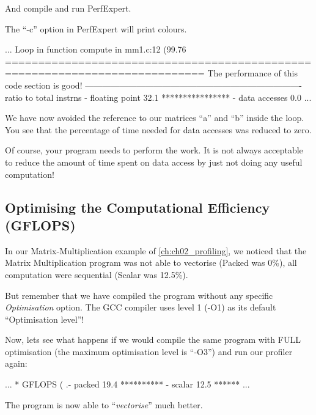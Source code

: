 And compile and run PerfExpert.

The ``-c'' option in PerfExpert will print colours.

\begin{prompt}
...
Loop in function compute in mm1.c:12 (99.76%
============================================================================
The performance of this code section is good!
----------------------------------------------------------------------------
ratio to total instrns    %
 - floating point       32.1 ****************
 - data accesses         0.0
...
\end{prompt}

We have now avoided the reference to our matrices ``a'' and ``b'' inside the loop. You see that the percentage of time needed for data accesses was reduced to zero.

 Of course, your program needs to perform the work. It is not always acceptable to reduce the amount of time spent on data access by just not doing any useful computation!

\subsection{Optimising the Computational Efficiency (GFLOPS)}
\label{subsec:Optimizing_Computational_Efficiancy}

In our Matrix-Multiplication example of \autoref{ch:ch02_profiling}, we noticed that the Matrix Multiplication program was not able to vectorise (Packed was 0\%), all computation were sequential (Scalar was 12.5\%).

But remember that we have compiled the program without any specific \textit{Optimisation} option. The GCC compiler uses level 1 (-O1) as its default ``Optimisation level''!

Now, lets see what happens if we would compile the same program with FULL optimisation (the maximum optimisation level is ``-O3'') and run our profiler again:

\begin{prompt}
...
* GFLOPS (%
.- packed               19.4 **********
 - scalar               12.5 ******
...
\end{prompt}

The program is now able to ``\textit{vectorise}'' much better.

